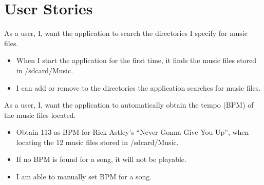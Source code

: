 \section{User Stories}
{As a user, I, want the application to search the directories I specify for music files.}
{\begin{itemize}
\item When I start the application for the first time, it finds the music files stored in /sdcard/Music.
\item I can add or remove to the directories the application searches for music files.
\end{itemize}}

{As a user, I, want the application to automatically obtain the tempo (BPM) of the music files located.}
{\begin{itemize}
\item Obtain 113 as BPM for Rick Astley's ``Never Gonna Give You Up'', when locating the 12 music files stored in /sdcard/Music.
\item If no BPM is found for a song, it will not be playable.
\item I am able to manually set BPM for a song.
\end{itemize}}